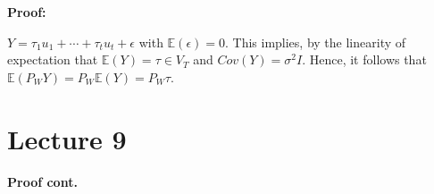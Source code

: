 \documentclass[12pt, oneside]{article}
\begin{document}
\textbf{Proof: }

$Y = \tau_{1} u_{1} + \cdots + \tau_{t} u_{t} + \epsilon$ with $\mathbb{E} (\epsilon) = 0$. This implies, by the linearity
of expectation that $\mathbb{E} (Y) = \tau \in V_{T}$ and $Cov(Y) = \sigma^{2}I$. Hence, it follows that 
$\mathbb{E} (P_{W}Y) = P_{W} \mathbb{E}(Y) = P_{W} \tau$.

\section{Lecture 9}

\textbf{Proof cont. }
\end{document}
